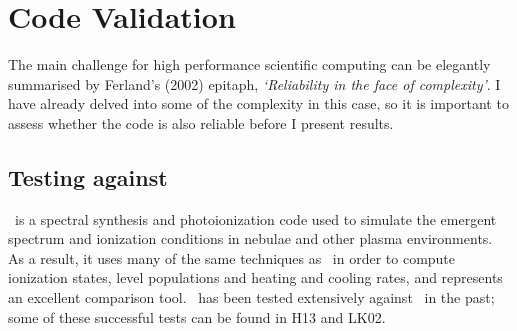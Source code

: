 




\section{Code Validation}
\label{sec:code_validation}

The main challenge for high performance scientific computing can be 
elegantly summarised by Ferland's (2002) epitaph, {\sl `Reliability in the face 
of complexity'}. I have already delved into some of the complexity in this case,
so it is important to assess whether the code is also reliable before I present
results. 

\subsection{Testing against \cld}

\cld\ is a spectral synthesis and photoionization code used to simulate
the emergent spectrum and ionization conditions in nebulae and other plasma
environments. As a result, it uses many of the same techniques as \py\
in order to compute ionization states, level populations and heating and cooling
rates, and represents an excellent comparison tool. \py\ has been tested extensively
against \cld\ in the past; some of these successful
tests can be found in H13 and LK02.

